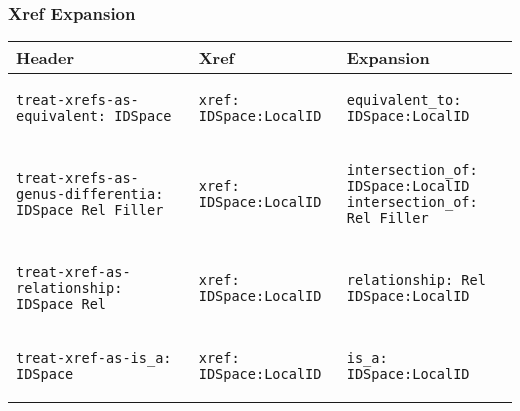 \subsubsection{Xref Expansion}

\begin{scriptsize}
\begin{table}
\begin{tabular}{ | p{5cm} | p{5cm} | p{5cm} |}
\hline
Header & Xref & Expansion \\

\hline
\begin{verbatim}
treat-xrefs-as-equivalent: IDSpace
\end{verbatim}
&
\begin{verbatim}
xref: IDSpace:LocalID
\end{verbatim}
&
\begin{verbatim}
equivalent_to: IDSpace:LocalID
\end{verbatim}
\\

\hline
\begin{verbatim}
treat-xrefs-as-genus-differentia: IDSpace Rel Filler
\end{verbatim}
&
\begin{verbatim}
xref: IDSpace:LocalID
\end{verbatim}
&
\begin{verbatim}
intersection_of: IDSpace:LocalID
intersection_of: Rel Filler
\end{verbatim}
\\

\hline
\begin{verbatim}
treat-xref-as-relationship: IDSpace Rel
\end{verbatim}
&
\begin{verbatim}
xref: IDSpace:LocalID
\end{verbatim}
&
\begin{verbatim}
relationship: Rel IDSpace:LocalID
\end{verbatim}
\\

\hline
\begin{verbatim}
treat-xref-as-is_a: IDSpace
\end{verbatim}
&
\begin{verbatim}
xref: IDSpace:LocalID
\end{verbatim}
&
\begin{verbatim}
is_a: IDSpace:LocalID
\end{verbatim}
\\


\end{tabular}
\end{table}
\end{scriptsize}
